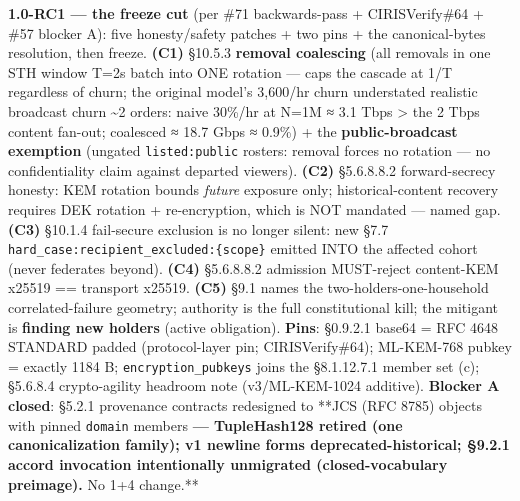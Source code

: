\documentclass[11pt]{article}
\begin{document}
\textbf{1.0-RC1 — the freeze cut} (per \#71 backwards-pass + CIRISVerify\#64 + \#57 blocker A): five honesty/safety patches + two pins + the canonical-bytes resolution, then freeze. \textbf{(C1)} §10.5.3 \textbf{removal coalescing} (all removals in one STH window T=2s batch into ONE rotation — caps the cascade at 1/T regardless of churn; the original model's 3,600/hr churn understated realistic broadcast churn \textasciitilde{}2 orders: naive 30\%/hr at N=1M ≈ 3.1 Tbps > the 2 Tbps content fan-out; coalesced ≈ 18.7 Gbps ≈ 0.9\%) + the \textbf{public-broadcast exemption} (ungated \texttt{listed:public} rosters: removal forces no rotation — no confidentiality claim against departed viewers). \textbf{(C2)} §5.6.8.8.2 forward-secrecy honesty: KEM rotation bounds \textit{future} exposure only; historical-content recovery requires DEK rotation + re-encryption, which is NOT mandated — named gap. \textbf{(C3)} §10.1.4 fail-secure exclusion is no longer silent: new §7.7 \texttt{hard\_case:recipient\_excluded:\{scope\}} emitted INTO the affected cohort (never federates beyond). \textbf{(C4)} §5.6.8.8.2 admission MUST-reject content-KEM x25519 == transport x25519. \textbf{(C5)} §9.1 names the two-holders-one-household correlated-failure geometry; authority is the full constitutional kill; the mitigant is \textbf{finding new holders} (active obligation). \textbf{Pins}: §0.9.2.1 base64 = RFC 4648 STANDARD padded (protocol-layer pin; CIRISVerify\#64); ML-KEM-768 pubkey = exactly 1184 B; \texttt{encryption\_pubkeys} joins the §8.1.12.7.1 member set (c); §5.6.8.4 crypto-agility headroom note (v3/ML-KEM-1024 additive). \textbf{Blocker A closed}: §5.2.1 provenance contracts redesigned to **JCS (RFC 8785) objects with pinned \texttt{domain} members\textbf{ — TupleHash128 retired (one canonicalization family); v1 newline forms deprecated-historical; §9.2.1 accord invocation intentionally unmigrated (closed-vocabulary preimage). }No 1+4 change.**
\end{document}
